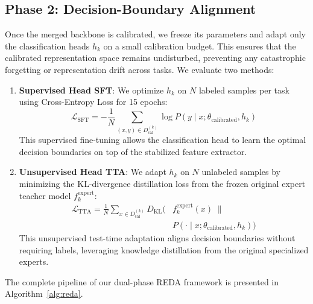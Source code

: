 \documentclass{article}
\theoremstyle{plain}
\theoremstyle{definition}
\theoremstyle{remark}
\begin{document}
\subsection{Phase 2: Decision-Boundary Alignment}
Once the merged backbone is calibrated, we freeze its parameters and adapt only the classification heads $h_k$ on a small calibration budget. This ensures that the calibrated representation space remains undisturbed, preventing any catastrophic forgetting or representation drift across tasks. We evaluate two methods:
\begin{enumerate}
    \item \textbf{Supervised Head SFT}: We optimize $h_k$ on $N$ labeled samples per task using Cross-Entropy Loss for 15 epochs:
    \begin{equation}
        \mathcal{L}_{\text{SFT}} = -\frac{1}{N} \sum_{(x, y) \in D_{\text{cal}}^{(k)}} \log P(y \mid x; \theta_{\text{calibrated}}, h_k)
    \end{equation}
    This supervised fine-tuning allows the classification head to learn the optimal decision boundaries on top of the stabilized feature extractor.
    \item \textbf{Unsupervised Head TTA}: We adapt $h_k$ on $N$ unlabeled samples by minimizing the KL-divergence distillation loss from the frozen original expert teacher model $f_k^{\text{expert}}$:
    \begin{align}
        \mathcal{L}_{\text{TTA}} = \frac{1}{N} \sum_{x \in D_{\text{cal}}^{(k)}} D_{\text{KL}}\Big( & f_k^{\text{expert}}(x) \;\parallel \nonumber \\
        & P(\cdot \mid x; \theta_{\text{calibrated}}, h_k) \Big)
    \end{align}
    This unsupervised test-time adaptation aligns decision boundaries without requiring labels, leveraging knowledge distillation from the original specialized experts.
\end{enumerate}

The complete pipeline of our dual-phase REDA framework is presented in Algorithm~\ref{alg:reda}.
\end{document}
